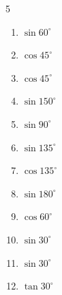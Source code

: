 \begin{multicols}{5}
\begin{enumerate}

  \item $\displaystyle \sin{60^\circ}$


  \item $\displaystyle \cos{45^\circ}$


  \item $\displaystyle \cos{45^\circ}$


  \item $\displaystyle \sin{150^\circ}$


  \item $\displaystyle \sin{90^\circ}$

        \phantom{$\displaystyle =1$}

  \item $\displaystyle \sin{135^\circ}$


  \item $\displaystyle \cos{135^\circ}$


  \item $\displaystyle \sin{180^\circ}$

        \phantom{$\displaystyle =0$}

  \item $\displaystyle \cos{60^\circ}$


  \item $\displaystyle \sin{30^\circ}$


  \item $\displaystyle \sin{30^\circ}$


  \item $\displaystyle \tan{30^\circ}$



\end{enumerate}
\end{multicols}
